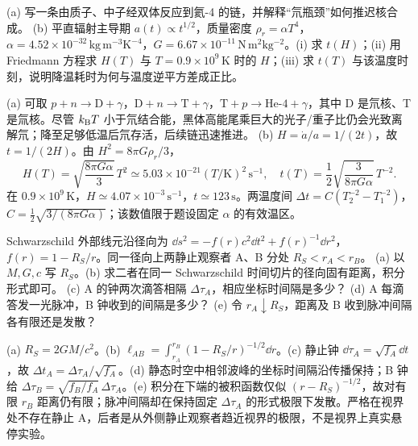 \begin{exercise}
(a) 写一条由质子、中子经双体反应到氦-4 的链，并解释“氘瓶颈”如何推迟核合成。
(b) 平直辐射主导期 $a(t)\propto t^{1/2}$，质量密度 $\rho_r=\alpha T^4$，$\alpha=4.52\times10^{-32}\,\mathrm{kg\,m^{-3}K^{-4}}$，$G=6.67\times10^{-11}\,\mathrm{N\,m^2kg^{-2}}$。(i) 求 $t(H)$；(ii) 用 Friedmann 方程求 $H(T)$ 与 $T=0.9\times10^9\,\mathrm K$ 时的 $H$；(iii) 求 $t(T)$ 与该温度时刻，说明降温耗时为何与温度逆平方差成正比。
\end{exercise}
\begin{solution}
(a) 可取 $p+n\to \mathrm D+\gamma$，$\mathrm D+n\to\mathrm{T}+\gamma$，$\mathrm T+p\to\mathrm{He}\mbox{-}4+\gamma$，其中 D 是氘核、T 是氚核。尽管 $k_{\mathrm B} T$ 小于氘结合能，黑体高能尾乘巨大的光子/重子比仍会光致离解氘；降至足够低温后氘存活，后续链迅速推进。
(b) $H=\dot a/a=1/(2t)$，故 $t=1/(2H)$。由 $H^2=8\pi G\rho_r/3$，
\[
H(T)=\sqrt{\frac{8\pi G\alpha}{3}}\,T^2
\simeq 5.03\times10^{-21}(T/\mathrm K)^2\,\mathrm{s^{-1}},
\quad
t(T)=\frac{1}{2}\sqrt{\frac{3}{8\pi G\alpha}}\,T^{-2}.
\]
在 $0.9\times10^9\,\mathrm K$，$H\simeq4.07\times10^{-3}\,\mathrm{s^{-1}}$，$t\simeq123\,\mathrm s$。两温度间 $\Delta t=C(T_2^{-2}-T_1^{-2})$，$C=\tfrac12\sqrt{3/(8\pi G\alpha)}$；该数值限于题设固定 $\alpha$ 的有效温区。
\end{solution}

\begin{exercise}
Schwarzschild 外部线元沿径向为
$\dd s^2=-f(r)c^2\dd t^2+f(r)^{-1}\dd r^2$，
$f(r)=1-R_S/r$。同一径向上两静止观察者 A、B 分处 $R_S<r_A<r_B$。
(a) 以 $M,G,c$ 写 $R_S$。(b) 求二者在同一 Schwarzschild 时间切片的径向固有距离，积分形式即可。
(c) A 的钟两次滴答相隔 $\Delta\tau_A$，相应坐标时间隔是多少？
(d) A 每滴答发一光脉冲，B 钟收到的间隔是多少？
(e) 令 $r_A\downarrow R_S$，距离及 B 收到脉冲间隔各有限还是发散？
\end{exercise}
\begin{solution}
(a) $R_S=2GM/c^2$。(b) $\ell_{AB}=\int_{r_A}^{r_B}(1-R_S/r)^{-1/2}\dd r$。(c) 静止钟 $\dd\tau_A=\sqrt{f_A}\dd t$，故 $\Delta t_A=\Delta\tau_A/\sqrt{f_A}$。(d) 静态时空中相邻波峰的坐标时间隔沿传播保持；B 钟给
$\Delta\tau_B=\sqrt{f_B/f_A}\,\Delta\tau_A$。(e) 积分在下端的被积函数仅似 $(r-R_S)^{-1/2}$，故对有限 $r_B$ 距离仍有限；脉冲间隔却在保持固定 $\Delta\tau_A$ 的形式极限下发散。严格在视界处不存在静止 A，后者是从外侧静止观察者趋近视界的极限，不是视界上真实悬停实验。
\end{solution}

